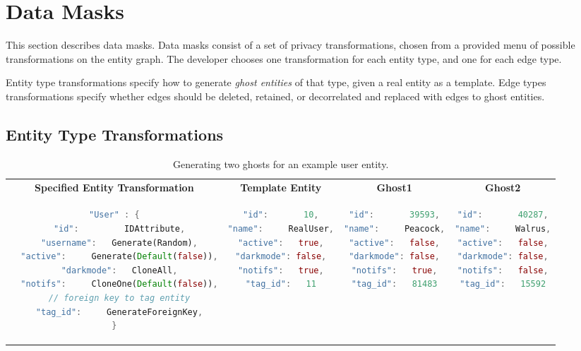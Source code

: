 \section{Data Masks}
\label{sec:policies}

This section describes data masks. Data masks consist of a set of privacy transformations, chosen
from a provided menu of possible transformations on the entity graph.
The developer chooses one transformation for each entity type, and one for each edge type.

Entity type transformations specify how to generate \emph{ghost entities} of that type, given a real
entity as a  template.  Edge types transformations specify whether edges should be deleted,
retained, or decorrelated and replaced with edges to ghost entities.

\subsection{Entity Type Transformations}
\label{sec:ghosting}

\begin{table}[t!]
    \centering
    \footnotesize
\begin{tabular}{@{}c|c|c|c@{}}
\textbf{Specified Entity Transformation} & \textbf{Template Entity} & \textbf{Ghost1} &
    \textbf{Ghost2} \\
\begin{lstlisting}[language=Rust]
"User" : {
  "id":         IDAttribute,
  "username":   Generate(Random),
  "active":     Generate(Default(false)),
  "darkmode":   CloneAll,
  "notifs":     CloneOne(Default(false)),
  // foreign key to tag entity
  "tag_id":     GenerateForeignKey,
}
\end{lstlisting}
    & 
\begin{lstlisting}[language=Rust]
"id":       10,
"name":     RealUser,
"active":   true,
"darkmode": false,
"notifs":   true,
"tag_id":   11
\end{lstlisting}
& 
\begin{lstlisting}[language=Rust]
"id":       39593,
"name":     Peacock,
"active":   false,
"darkmode": false,
"notifs":   true,
"tag_id":   81483
\end{lstlisting}
&
\begin{lstlisting}[language=Rust]
"id":       40287,
"name":     Walrus,
"active":   false,
"darkmode": false,
"notifs":   false,
"tag_id":   15592
\end{lstlisting}
\end{tabular}
    \caption{Generating two ghosts for an example user entity.} 
    \label{tab:ghosting}
\end{table}


